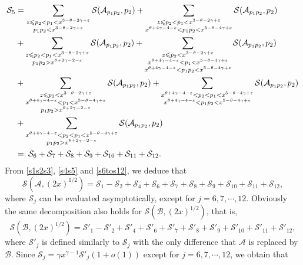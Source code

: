 \documentclass[12pt, reqno, twoside, letterpaper]{amsart}
\numberwithin{equation}{section}
\newcommand{\cA}{\ensuremath{\mathcal{A}}}
\newcommand{\cB}{\ensuremath{\mathcal{B}}}
\newcommand{\cS}{\ensuremath{\mathcal{S}}}
\theoremstyle{customthm}
\theoremstyle{customrem}
\newcommand*{\eqdef}{=\mathrel{\vcenter{\baselineskip0.5ex \lineskiplimit0pt
			\hbox{\scriptsize.}\hbox{\scriptsize.}}}%
}
\begin{document}
\begin{align}\label{s6tos12}
\nonumber \cS_5 &= \sum_{\substack{z \leqslant p_2 < p_1 < x^{3-\theta-2\gamma+\varepsilon} \\ p_1p_2 < x^{3-\theta-2\gamma+\varepsilon}}} \cS(\cA_{p_1p_2},p_2)+ \sum_{\substack{z \leqslant p_2 < p_1 < x^{3-\theta-2\gamma+\varepsilon} \\ x^{\theta + 4\gamma -4 - \varepsilon} < p_1p_2 < x^{5-\theta-4\gamma+\varepsilon}}} \cS(\cA_{p_1p_2},p_2) \\
\nonumber &+ \sum_{\substack{z \leqslant p_2 < p_1 < x^{3-\theta-2\gamma+\varepsilon} \\ p_1p_2 > x^{\theta+2\gamma-2 - \varepsilon}}} \cS(\cA_{p_1p_2},p_2) + \sum_{\substack{z \leqslant p_2 < x^{3-\theta-2\gamma+\varepsilon} \\ x^{\theta + 4\gamma -4 - \varepsilon} < p_1 < x^{5-\theta-4\gamma+\varepsilon} \\x^{\theta + 4\gamma -4 - \varepsilon} < p_1p_2 < x^{5-\theta-4\gamma+\varepsilon}}} \cS(\cA_{p_1p_2},p_2) \\
\nonumber &+ \sum_{\substack{z \leqslant p_2 < x^{3-\theta-2\gamma+\varepsilon} \\ x^{\theta + 4\gamma -4 - \varepsilon} < p_1 < x^{5-\theta-4\gamma+\varepsilon} \\p_1p_2 > x^{\theta + 2\gamma -2 - \varepsilon} }} \cS(\cA_{p_1p_2},p_2) + \sum_{\substack{x^{\theta + 4\gamma -4 - \varepsilon} < p_2 < p_1 < x^{5-\theta-4\gamma+\varepsilon} \\ x^{\theta + 4\gamma -4 - \varepsilon} < p_1p_2 < x^{5-\theta-4\gamma+\varepsilon}}} \cS(\cA_{p_1p_2},p_2) \\
\nonumber &+ \sum_{\substack{x^{\theta + 4\gamma -4 - \varepsilon} < p_2 < p_1 < x^{5-\theta-4\gamma+\varepsilon} \\ p_1p_2 > x^{\theta+2\gamma-2 - \varepsilon}}} \cS(\cA_{p_1p_2},p_2) \\
&\eqdef \cS_6 + \cS_7 +\cS_8+\cS_9+\cS_{10}+\cS_{11}+\cS_{12}.
\end{align}
From \eqref{s1s2s3}, \eqref{s4s5} and \eqref{s6tos12}, we deduce that
$$
\cS(\cA,(2x)^{1/2}) = \cS_1 - \cS_2 + \cS_4 + \cS_6 + \cS_7 +\cS_8+\cS_9+\cS_{10}+\cS_{11}+\cS_{12},
$$
where $\cS_j$ can be evaluated asymptotically, except for $j=6,7, \cdots,12$. Obviously the same decomposition also holds for $\cS(\cB,(2x)^{1/2})$, that is,
$$
\cS(\cB,(2x)^{1/2}) = \cS'_1 - \cS'_2 + \cS'_4 + \cS'_6 + \cS'_7 + \cS'_8+\cS'_9+\cS'_{10}+\cS'_{11}+\cS'_{12},
$$
where $\cS'_j$ is defined similarly to $\cS_j$ with the only difference that $\cA$ is replaced by $\cB$. Since $\cS_j = \gamma x^{\gamma-1} \cS'_j(1+o(1))$ except for $j=6,7,\cdots,12$, we obtain that
\end{document}
